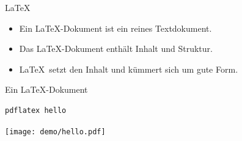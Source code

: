 \begin{Frame}[fragile]{\LaTeX}
  \begin{itemize}
    \item Ein \LaTeX-Dokument ist ein \alert{reines Textdokument}.
    \item Das \LaTeX-Dokument enthält \alert{Inhalt und Struktur}.
    \item \LaTeX\ setzt den Inhalt und kümmert sich um \alert{gute Form}.
  \end{itemize}

  \xxx
  
  \begin{center}
  \end{center}
\end{Frame}

\begin{Frame}[fragile,t]{Ein \LaTeX-Dokument}
  

  \pause
  \xxx

  \begin{lstlisting}[language={},morekeywords={pdflatex},gobble=4]
    pdflatex hello
  \end{lstlisting}

  \pause
  \xxx

  \begin{center}
    \texttt{[image: demo/hello.pdf]}
  \end{center}
\end{Frame}

